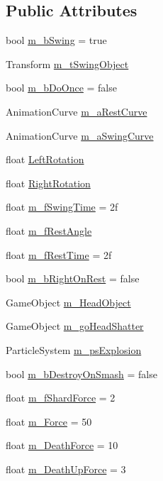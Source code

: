 \subsection*{Public Attributes}
\begin{DoxyCompactItemize}
\item 
bool \mbox{\hyperlink{class_pendulum_a4e3df49f9efcd5e1df29a84557720e34}{m\+\_\+b\+Swing}} = true
\item 
Transform \mbox{\hyperlink{class_pendulum_a1f4b8a46360de1da1a0326e5968e1959}{m\+\_\+t\+Swing\+Object}}
\item 
bool \mbox{\hyperlink{class_pendulum_ad761f0180bb98c4f810c3e326d6dc7b1}{m\+\_\+b\+Do\+Once}} = false
\item 
Animation\+Curve \mbox{\hyperlink{class_pendulum_a8563691dcaa4c6d49be47d22d534f3d6}{m\+\_\+a\+Rest\+Curve}}
\item 
Animation\+Curve \mbox{\hyperlink{class_pendulum_a4e6a19a283d1ebbe16b33e6ca4516967}{m\+\_\+a\+Swing\+Curve}}
\item 
float \mbox{\hyperlink{class_pendulum_a9dea0e58df8856dbc4d07230bf9c17b6}{Left\+Rotation}}
\item 
float \mbox{\hyperlink{class_pendulum_aba3b1c8ada6a5211ee0bc50303ee40ca}{Right\+Rotation}}
\item 
float \mbox{\hyperlink{class_pendulum_a54e8b55f827d764934414900ed1dbd7d}{m\+\_\+f\+Swing\+Time}} = 2f
\item 
float \mbox{\hyperlink{class_pendulum_a8a81c618b9f7fe4ecaf68a96165a9de7}{m\+\_\+f\+Rest\+Angle}}
\item 
float \mbox{\hyperlink{class_pendulum_a5fb9cfa9cc7af735eb6d4415e1abaf74}{m\+\_\+f\+Rest\+Time}} = 2f
\item 
bool \mbox{\hyperlink{class_pendulum_a12661344b4893ab6a6ba99d074c582a5}{m\+\_\+b\+Right\+On\+Rest}} = false
\item 
Game\+Object \mbox{\hyperlink{class_pendulum_a09edfe58b1f4cf3e11e3495af512d71f}{m\+\_\+\+Head\+Object}}
\item 
Game\+Object \mbox{\hyperlink{class_pendulum_a8ebe2dbe7370d7c583079208dd30e006}{m\+\_\+go\+Head\+Shatter}}
\item 
Particle\+System \mbox{\hyperlink{class_pendulum_ad72d7ca75ee2d3db8de1faceb3aa74b2}{m\+\_\+ps\+Explosion}}
\item 
bool \mbox{\hyperlink{class_pendulum_a2eed509ac7e18228a72ac72955ebec4b}{m\+\_\+b\+Destroy\+On\+Smash}} = false
\item 
float \mbox{\hyperlink{class_pendulum_ae2149fc5b8efb92487fbb0fc39e5e75e}{m\+\_\+f\+Shard\+Force}} = 2
\item 
float \mbox{\hyperlink{class_pendulum_a8a9bf6eb834060c588a83ff0b3bcfb57}{m\+\_\+\+Force}} = 50
\item 
float \mbox{\hyperlink{class_pendulum_a6a774a542e6c6be8b1b9257143aad31a}{m\+\_\+\+Death\+Force}} = 10
\item 
float \mbox{\hyperlink{class_pendulum_af69a15b434d176d78a361f1baab1a8ae}{m\+\_\+\+Death\+Up\+Force}} = 3
\end{DoxyCompactItemize}


